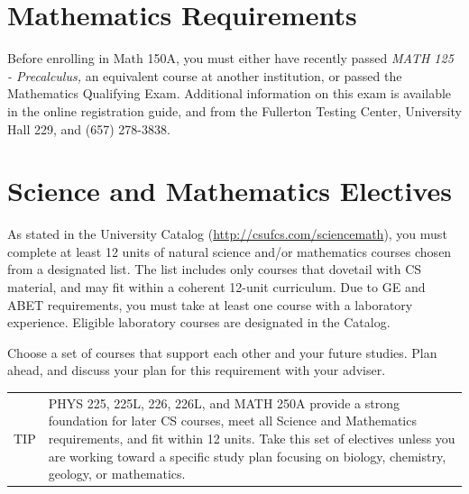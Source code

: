 \documentclass{book}
\newenvironment{tip}{
  \tcolorbox \begin{tabular}{m{.5in} m{5.25in}}
    \Large{TIP} &
}{
  \end{tabular} \endtcolorbox
}
\newcommand{\shrunkurl}[1]{\url{http://csufcs.com/#1}}
\begin{document}
\section{Mathematics Requirements}

Before enrolling in Math 150A, you must either have recently passed
\emph{MATH 125 - Precalculus,} an equivalent course at another
institution, or passed the Mathematics Qualifying Exam. Additional
information on this exam is available in the online registration
guide, and from the Fullerton Testing Center, University Hall 229, and
(657) 278-3838.

\section{Science and Mathematics Electives}

As stated in the University Catalog (\shrunkurl{sciencemath}), you
must complete at least 12 units of natural science and/or mathematics
courses chosen from a designated list. The list includes only courses
that dovetail with CS material, and may fit within a coherent 12-unit
curriculum. Due to GE and ABET requirements, you must take at least
one course with a laboratory experience. Eligible laboratory courses
are designated in the Catalog.

Choose a set of courses that support each other and your future
studies. Plan ahead, and discuss your plan for this requirement with
your adviser.

\begin{tip}
PHYS 225, 225L, 226, 226L, and MATH 250A provide a strong foundation
for later CS courses, meet all Science and Mathematics requirements,
and fit within 12 units. Take this set of electives unless you are
working toward a specific study plan focusing on biology, chemistry,
geology, or mathematics.
\end{tip}


\end{document}
